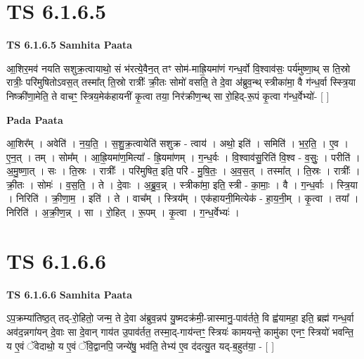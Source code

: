 \documentclass[17pt]{extarticle}
\begin{document}
\section*{ TS 6.1.6.5 }

\textbf{TS 6.1.6.5 } \newline
\textbf{Samhita Paata} \newline

आ॒शिर॒मव॑ नयति सशुक्र॒त्वायाथो॒ सं भ॑रत्ये॒वैन॒त् तꣳ सोम॑-माह्रि॒यमा॑णं गन्ध॒र्वो वि॒श्वाव॑सः॒ पर्य॑मुष्णा॒थ् स ति॒स्रो रात्रीः॒ परि॑मुषितोऽवस॒त् तस्मा᳚त् ति॒स्रो रात्रीः᳚ क्री॒तः सोमो॑ वसति॒ ते दे॒वा अ॑ब्रुव॒न्थ् स्त्रीका॑मा॒ वै ग॑न्ध॒र्वा स्स्त्रि॒या निष्क्री॑णा॒मेति॒ ते वाचꣳ॒॒ स्त्रिय॒मेक॑हायनीं कृ॒त्वा तया॒ निर॑क्रीण॒न्थ् सा रो॒हिद्-रू॒पं कृ॒त्वा ग॑न्ध॒र्वेभ्यो॑- [  ] \newline

\textbf{Pada Paata} \newline

आ॒शिर᳚म् । अवेति॑ । न॒य॒ति॒ । स॒शु॒क्र॒त्वायेति॑ सशुक्र - त्वाय॑ । अथो॒ इति॑ । समिति॑ । भ॒र॒ति॒ । ए॒व । ए॒न॒त् । तम् । सोम᳚म् । आ॒ह्रि॒यमा॑ण॒मित्या᳚ - ह्रि॒यमा॑णम् । ग॒न्ध॒र्वः । वि॒श्वाव॑सु॒रिति॑ वि॒श्व - व॒सुः॒ । परीति॑ । अ॒मु॒ष्णा॒त् । सः । ति॒स्रः । रात्रीः᳚ । परि॑मुषित॒ इति॒ परि॑ - मु॒षि॒तः॒ । अ॒व॒स॒त् । तस्मा᳚त् । ति॒स्रः । रात्रीः᳚ । क्री॒तः । सोमः॑ । व॒स॒ति॒ । ते । दे॒वाः । अ॒ब्रु॒व॒न्न् । स्त्रीका॑मा॒ इति॒ स्त्री - का॒माः॒ । वै । ग॒न्ध॒र्वाः । स्त्रि॒या । निरिति॑ । क्री॒णा॒म॒ । इति॑ । ते । वाच᳚म् । स्त्रिय᳚म् । एक॑हायनी॒मित्येक॑ - हा॒य॒नी॒म् । कृ॒त्वा । तया᳚ । निरिति॑ । अ॒क्री॒ण॒न्न् । सा । रो॒हित् । रू॒पम् । कृ॒त्वा । ग॒न्ध॒र्वेभ्यः॑ ।  \newline




\section*{ TS 6.1.6.6 }

\textbf{TS 6.1.6.6 } \newline
\textbf{Samhita Paata} \newline

ऽप॒क्रम्या॑तिष्ठ॒त् तद्-रो॒हितो॒ जन्म॒ ते दे॒वा अ॑ब्रुव॒न्नप॑ यु॒ष्मदक्र॑मी॒-न्नास्मानु॒-पाव॑र्तते॒ वि ह्व॑यामहा॒ इति॒ ब्रह्म॑ गन्ध॒र्वा अव॑द॒न्नगा॑यन् दे॒वाः सा दे॒वान् गाय॑त उ॒पाव॑र्तत॒ तस्मा॒द्-गाय॑न्तꣳ॒॒ स्त्रियः॑ कामयन्ते॒ कामु॑का एनꣳ॒॒ स्त्रियो॑ भवन्ति॒ य ए॒वं ॅवेदाथो॒ य ए॒वं ॅवि॒द्वानपि॒ जन्ये॑षु॒ भव॑ति॒ तेभ्य॑ ए॒व द॑दत्यु॒त यद्-ब॒हुत॑या॒ - [  ] \newline
\end{document}
